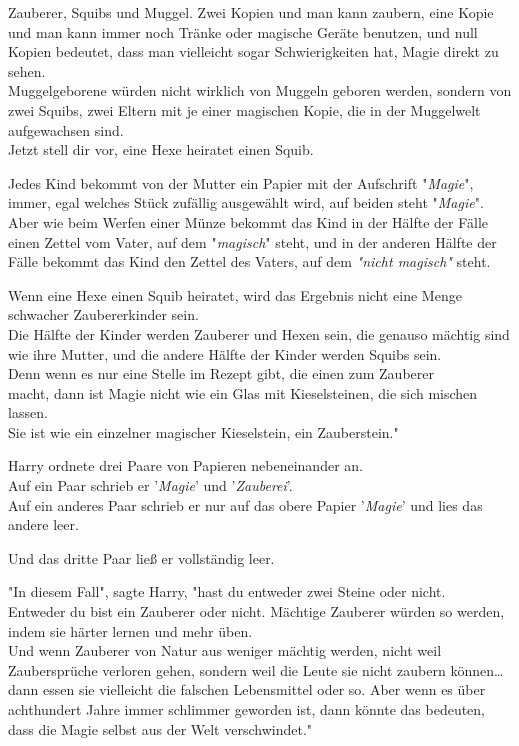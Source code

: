 {Zauberer, Squibs und Muggel. Zwei Kopien und man kann zaubern, eine Kopie und man kann immer noch Tränke oder magische Geräte benutzen, und null Kopien bedeutet, dass man vielleicht sogar Schwierigkeiten hat, Magie direkt zu sehen.\\ Muggelgeborene würden nicht wirklich von Muggeln geboren werden, sondern von zwei Squibs, zwei Eltern mit je einer magischen Kopie, die in der Muggelwelt aufgewachsen sind.\\ Jetzt stell dir vor, eine Hexe heiratet einen Squib.

Jedes Kind bekommt von der Mutter ein Papier mit der Aufschrift "\emph{Magie}", immer, egal welches Stück zufällig ausgewählt wird, auf beiden steht "\emph{Magie}".\\ Aber wie beim Werfen einer Münze bekommt das Kind in der Hälfte der Fälle einen Zettel vom Vater, auf dem "\emph{magisch}" steht, und in der anderen Hälfte der Fälle bekommt das Kind den Zettel des Vaters, auf dem \emph{"nicht magisch"} steht.

Wenn eine Hexe einen Squib heiratet, wird das Ergebnis nicht eine Menge schwacher Zaubererkinder sein.\\ Die Hälfte der Kinder werden Zauberer und Hexen sein, die genauso mächtig sind wie ihre Mutter, und die andere Hälfte der Kinder werden Squibs sein.\\ Denn wenn es nur eine Stelle im Rezept gibt, die einen zum Zauberer\\ macht, dann ist Magie nicht wie ein Glas mit Kieselsteinen, die sich mischen lassen.\\ Sie ist wie ein einzelner magischer Kieselstein, ein Zauberstein."

Harry ordnete drei Paare von Papieren nebeneinander an.\\ Auf ein Paar schrieb er '\emph{Magie}' und '\emph{Zauberei}'.\\ Auf ein anderes Paar schrieb er nur auf das obere Papier '\emph{Magie}' und lies das andere leer.

Und das dritte Paar ließ er vollständig leer.

"In diesem Fall", sagte Harry, "hast du entweder zwei Steine oder nicht.\\ Entweder du bist ein Zauberer oder nicht. Mächtige Zauberer würden so werden, indem sie härter lernen und mehr üben.\\ Und wenn Zauberer von Natur aus weniger mächtig werden, nicht weil Zaubersprüche verloren gehen, sondern weil die Leute sie nicht zaubern können… dann essen sie vielleicht die falschen Lebensmittel oder so. Aber wenn es über achthundert Jahre immer schlimmer geworden ist, dann könnte das bedeuten, dass die Magie selbst aus der Welt verschwindet."

}
